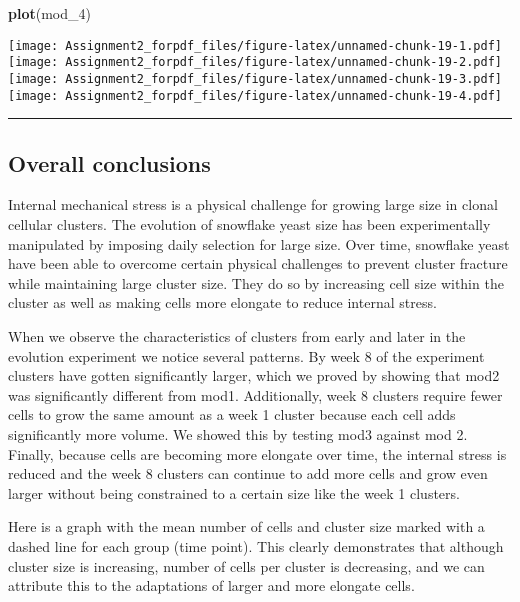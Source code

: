 \documentclass[]{article}
\newenvironment{Shaded}{\begin{snugshade}}{\end{snugshade}}
\newcommand{\KeywordTok}[1]{\textcolor[rgb]{0.13,0.29,0.53}{\textbf{#1}}}
\newcommand{\DecValTok}[1]{\textcolor[rgb]{0.00,0.00,0.81}{#1}}
\newcommand{\NormalTok}[1]{#1}
\begin{document}
\begin{Shaded}
\begin{Highlighting}[]
\KeywordTok{plot}\NormalTok{(mod_}\DecValTok{4}\NormalTok{)}
\end{Highlighting}
\end{Shaded}

\texttt{[image: Assignment2\_forpdf\_files/figure-latex/unnamed-chunk-19-1.pdf]}
\texttt{[image: Assignment2\_forpdf\_files/figure-latex/unnamed-chunk-19-2.pdf]}
\texttt{[image: Assignment2\_forpdf\_files/figure-latex/unnamed-chunk-19-3.pdf]}
\texttt{[image: Assignment2\_forpdf\_files/figure-latex/unnamed-chunk-19-4.pdf]}

\begin{center}\rule{0.5\linewidth}{\linethickness}\end{center}

\subsection{Overall conclusions}\label{overall-conclusions}

Internal mechanical stress is a physical challenge for growing large
size in clonal cellular clusters. The evolution of snowflake yeast size
has been experimentally manipulated by imposing daily selection for
large size. Over time, snowflake yeast have been able to overcome
certain physical challenges to prevent cluster fracture while
maintaining large cluster size. They do so by increasing cell size
within the cluster as well as making cells more elongate to reduce
internal stress.

When we observe the characteristics of clusters from early and later in
the evolution experiment we notice several patterns. By week 8 of the
experiment clusters have gotten significantly larger, which we proved by
showing that mod2 was significantly different from mod1. Additionally,
week 8 clusters require fewer cells to grow the same amount as a week 1
cluster because each cell adds significantly more volume. We showed this
by testing mod3 against mod 2. Finally, because cells are becoming more
elongate over time, the internal stress is reduced and the week 8
clusters can continue to add more cells and grow even larger without
being constrained to a certain size like the week 1 clusters.

Here is a graph with the mean number of cells and cluster size marked
with a dashed line for each group (time point). This clearly
demonstrates that although cluster size is increasing, number of cells
per cluster is decreasing, and we can attribute this to the adaptations
of larger and more elongate cells.
\end{document}

